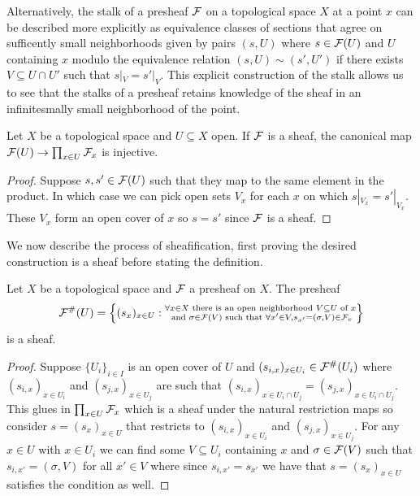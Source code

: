 Alternatively, the stalk of a presheaf $\mathcal{F}$ on a topological space $X$ at a point $x$ can be described more explicitly as equivalence classes of sections that agree on sufficently small neighborhoods given by pairs $(s,U)$ where $s\in\mathcal{F}(U)$ and $U$ containing $x$ modulo the equivalence relation $(s,U)\sim(s',U')$ if there exists $V\subseteq U\cap U'$ such that $s|_{V}=s'|_{V}$. This explicit construction of the stalk allows us to see that the stalks of a presheaf retains knowledge of the sheaf in an infinitesmally small neighborhood of the point. 
\begin{lemma}\label{lem: map to stalks is injective}
    Let $X$ be a topological space and $U\subseteq X$ open. If $\mathcal{F}$ is a sheaf, the canonical map $\mathcal{F}(U)\to\prod_{x\in U}\mathcal{F}_{x}$ is injective. 
\end{lemma}
\begin{proof}
    Suppose $s,s'\in\mathcal{F}(U)$ such that they map to the same element in the product. In which case we can pick open sets $V_{x}$ for each $x$ on which $s|_{V_{x}}=s'|_{V_{x}}$. These $V_{x}$ form an open cover of $x$ so $s=s'$ since $\mathcal{F}$ is a sheaf. 
\end{proof}
We now describe the process of sheafification, first proving the desired construction is a sheaf before stating the definition. 
\begin{proposition}\label{prop: sheafification is a sheaf}
    Let $X$ be a topological space and $\mathcal{F}$ a presheaf on $X$. The presheaf 
    $$\mathcal{F}^{\#}(U)=\left\{(s_{x})_{x\in U}:\substack{\forall x\in X \text{ there is an open neighborhood }V\subseteq U\text{ of }x \\ \text{ and }\sigma\in\mathcal{F}(V)\text{ such that }\forall x'\in V, s_{x'}=(\sigma,V)\in\mathcal{F}_{v}}\right\}$$
    is a sheaf. 
\end{proposition}
\begin{proof}
    Suppose $\{U_{i}\}_{i\in I}$ is an open cover of $U$ and $(s_{i,x})_{x\in U_{i}}\in\mathcal{F}^{\#}(U_{i})$ where $(s_{i,x})_{x\in U_{i}}$ and $(s_{j,x})_{x\in U_{j}}$ are such that $(s_{i,x})_{x\in U_{i}\cap U_{j}} = (s_{j,x})_{x\in U_{i}\cap U_{j}}$. This glues in $\prod_{x\in U}\mathcal{F}_{x}$ which is a sheaf under the natural restriction maps so consider $s=(s_{x})_{x\in U}$ that restricts to $(s_{i,x})_{x\in U_{i}}$ and $(s_{j,x})_{x\in U_{j}}$. For any $x\in U$ with $x\in U_{i}$ we can find some $V\subseteq U_{i}$ containing $x$ and $\sigma\in\mathcal{F}(V)$ such that $s_{i,x'}=(\sigma,V)$ for all $x'\in V$ where since $s_{i,x'}=s_{x'}$ we have that $s=(s_{x})_{x\in U}$ satisfies the condition as well. 
\end{proof}
